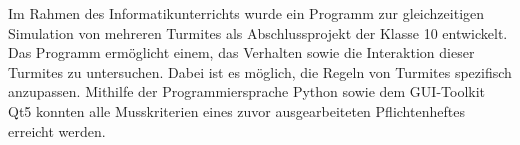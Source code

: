 Im Rahmen des Informatikunterrichts wurde ein Programm zur gleichzeitigen Simulation von mehreren Turmites als Abschlussprojekt der Klasse 10 entwickelt. Das Programm ermöglicht einem, das Verhalten sowie die Interaktion dieser Turmites zu untersuchen. Dabei ist es möglich, die Regeln von Turmites spezifisch anzupassen. Mithilfe der Programmiersprache Python sowie dem GUI-Toolkit Qt5 \cite{qt5} konnten alle Musskriterien eines zuvor ausgearbeiteten Pflichtenheftes \cite{pflichtenheft} erreicht werden.